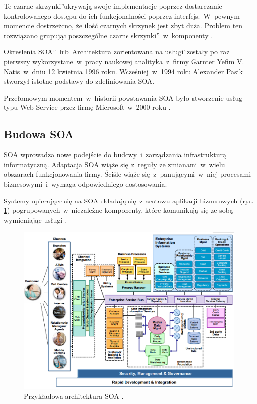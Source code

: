 Te \quotedblbase czarne skrzynki\textquotedblright ukrywają swoje implementacje poprzez dostarczanie kontrolowanego dostępu do ich funkcjonalności poprzez interfejs.~W~pewnym momencie dostrzeżono, że ilość czarnych skrzynek jest zbyt duża. Problem ten rozwiązano grupując poszczególne \quotedblbase czarne skrzynki\textquotedblright~w~komponenty \cite{SteveMichSOA}. 

Określenia \quotedblbase SOA\textquotedblright ~lub~\quotedblbase Architektura zorientowana na usługi\textquotedblright zostały po raz pierwszy wykorzystane~w~pracy naukowej analityka~z~firmy Garnter Yefim V. Natis~w~dniu 12 kwietnia 1996 roku. Wcześniej~w~1994 roku Alexander Pasik stworzył istotne podstawy do zdefiniowania SOA. 

Przełomowym momentem~w~historii powstawania SOA było utworzenie usług typu Web Service przez firmę Microsoft~w~2000 roku \cite{JosSOAHist}.

\subsection{Budowa SOA}
SOA wprowadza nowe podejście do budowy~i~zarządzania infrastrukturą informatyczną. Adaptacja SOA wiąże się~z~reguły ze zmianami~w~wielu obszarach funkcjonowania firmy. Ściśle wiąże się~z~panującymi~w~niej procesami biznesowymi~i~wymaga odpowiedniego dostosowania.

Systemy opierające się na SOA składają się~z~zestawu aplikacji biznesowych (rys. \ref{PRZArchSOA}) pogrupowanych~w~niezależne komponenty, które komunikują się ze sobą wymieniając usługi \cite{SOAwJBBC}. 

\begin{figure}[h!tbp]
\begin{centering}
\includegraphics[width=15cm]{img/soa_arch.png}
\caption[Przykładowa architektura SOA.]{Przykładowa architektura SOA \cite{EXEntArchSOA}.}\label{PRZArchSOA}
\end{centering}
\end{figure}

